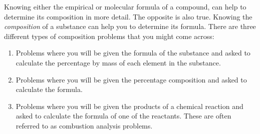 Knowing either the empirical or molecular formula of a compound, can help to determine its composition in more detail. The opposite is also true. Knowing the \textit{composition} of a substance can help you to determine its formula. There are three different types of composition problems that you might come across:

\begin{enumerate}
\item Problems where you will be given the formula of the substance and asked to calculate the percentage by mass of each element in the substance.
\item Problems where you will be given the percentage composition and asked to calculate the formula.
\item Problems where you will be given the products of a chemical reaction and asked to calculate the formula of one of the reactants. These are often referred to as combustion analysis problems.
\end{enumerate}

